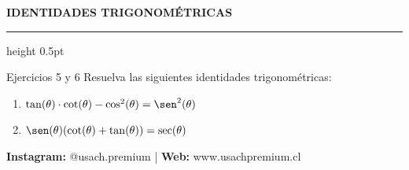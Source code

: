 \documentclass[letterpaper, 12pt]{article}
\begin{document}
\vspace{0.4cm}
\begin{center}
    \color{azulFuerte}\textbf{\small IDENTIDADES TRIGONOMÉTRICAS}
    \hrule height 0.5pt
\end{center}

\begin{ejerciciobox}{Ejercicios 5 y 6}
    \vspace{0.3cm}
    Resuelva las siguientes identidades trigonométricas:
    \begin{enumerate}[label=\textbf{\alph*)}]
        \item $\tan(\theta) \cdot \cot(\theta) - \cos^{2}(\theta) = \sen^{2}(\theta)$
        \item $\sen(\theta)(\cot(\theta) + \tan(\theta)) = \sec(\theta)$
    \end{enumerate}
\end{ejerciciobox}

\vfill
\begin{center}
    \footnotesize \color{azulFuerte} \textbf{Instagram:} @usach.premium \quad | \quad \textbf{Web:} www.usachpremium.cl
\end{center}
\end{document}
